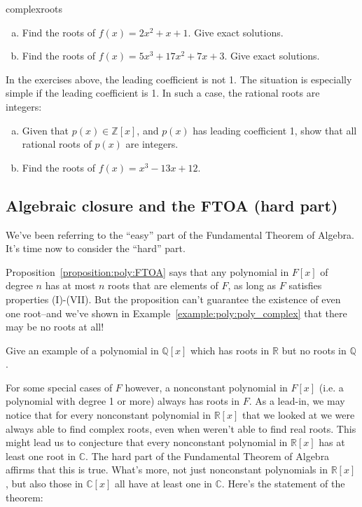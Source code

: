 \begin{exercise}{complexroots}
\begin {enumerate}[(a)]
\item
Find the roots of $f(x)=2x^2+x+1$. Give exact solutions.
\item
Find the roots of $f(x)=5x^3+17x^2+7x+3$. Give exact solutions. 
\end{enumerate}
\end{exercise}
 
In the exercises above, the leading coefficient is not 1. The situation is especially simple if the leading coefficient is 1. In such a case, the rational  roots are integers:

\begin{exercise}{}
\begin{enumerate}[(a)]
\item
Given that $p(x)  \in \mathbb{Z}[x]$, and $p(x)$ has leading coefficient 1, show that all rational roots of $p(x)$ are integers.
\item
Find the roots of $f(x)=x^3-13x+12$.
\end{enumerate}
\end{exercise}


\subsection{Algebraic closure and the FTOA (hard part)}\label{subsec:FTOAhard}

We've been referring to the ``easy'' part of the Fundamental Theorem of Algebra. It's time now to consider the ``hard'' part. 

Proposition~\ref{proposition:poly:FTOA} says that any polynomial in $F[x]$ of degree $n$ has at most $n$ roots that are elements of $F$, as long as $F$ satisfies properties (I)-(VII).  But the proposition can't guarantee the existence of even one root--and we've shown in Example~\ref{example:poly:poly_complex} that there may be no roots at all! 

\begin{exercise}{}
Give an example of a polynomial in ${\mathbb Q}[x]$ which has roots in ${\mathbb R}$ but no roots in ${\mathbb Q}$.
\end{exercise}

For  some special cases of $F$ however, a nonconstant polynomial in $F[x]$ (i.e. a polynomial with degree 1 or more) always has roots in $F$. As a lead-in, we may notice that  for every nonconstant polynomial in $\mathbb{R}[x]$ that we looked at we were always able to find complex roots, even when weren't able to find real roots. This might lead us to conjecture that every nonconstant polynomial in $\mathbb{R}[x]$ has at least one root in $\mathbb{C}$.  The hard part of the Fundamental Theorem of Algebra affirms that this is true. What's more, not just nonconstant polynomials in $\mathbb{R}[x]$, but also those in $\mathbb{C}[x]$ all have at least one in $\mathbb{C}$. Here's the statement of the theorem:

